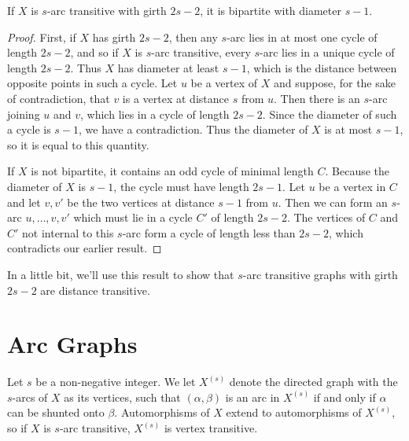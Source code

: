 \begin{lemma}[Tutte]
	If $X$ is $s$-arc transitive with girth $2s-2$, it is bipartite with diameter $s-1$.
\end{lemma}
\begin{proof}
	First, if $X$ has girth $2s-2$, then any $s$-arc lies in at most one cycle of length $2s-2$, and so if $X$ is $s$-arc transitive, every $s$-arc lies in a unique cycle of length $2s-2$.  Thus $X$ has diameter at least $s-1$, which is the distance between opposite points in such a cycle.  Let $u$ be a vertex of $X$ and suppose, for the sake of contradiction, that $v$ is a vertex at distance $s$ from $u$.  Then there is an $s$-arc joining $u$ and $v$, which lies in a cycle of length $2s-2$.  Since the diameter of such a cycle is $s-1$, we have a contradiction.  Thus the diameter of $X$ is at most $s-1$, so it is equal to this quantity.
	
	If $X$ is not bipartite, it contains an odd cycle of minimal length $C$.  Because the diameter of $X$ is $s-1$, the cycle must have length $2s-1$.  Let $u$ be a vertex in $C$ and let $v,v'$ be the two vertices at distance $s-1$ from $u$.  Then we can form an $s$-arc $u,\dots,v,v'$ which must lie in a cycle $C'$ of length $2s-2$.  The vertices of $C$ and $C'$ not internal to this $s$-arc form a cycle of length less than $2s-2$, which contradicts our earlier result.
\end{proof}

In a little bit, we'll use this result to show that $s$-arc transitive graphs with girth $2s-2$ are distance transitive.






\section*{Arc Graphs}


Let $s$ be a non-negative integer.  We let $X^{(s)}$ denote the directed graph with the $s$-arcs of $X$ as its vertices, such that $(\alpha,\beta)$ is an arc in $X^{(s)}$ if and only if $\alpha$ can be shunted onto $\beta$.  Automorphisms of $X$ extend to automorphisms of $X^{(s)}$, so if $X$ is $s$-arc transitive, $X^{(s)}$ is vertex transitive.

